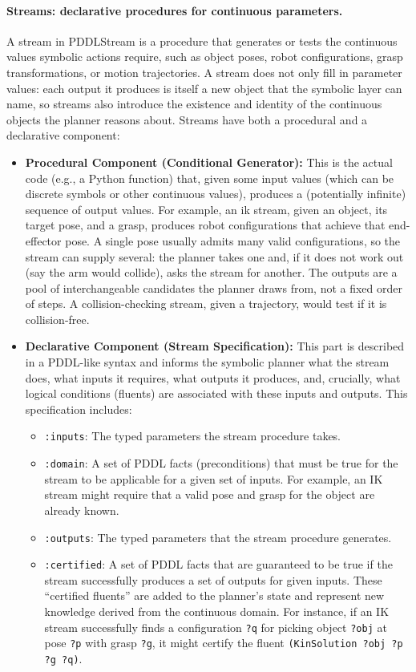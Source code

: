 \paragraph{Streams: declarative procedures for continuous parameters.}
A stream in PDDLStream is a procedure that generates or tests the continuous values symbolic actions require, such as object poses, robot configurations, grasp transformations, or motion trajectories. A stream does not only fill in parameter values: each output it produces is itself a new object that the symbolic layer can name, so streams also introduce the existence and identity of the continuous objects the planner reasons about. Streams have both a procedural and a declarative component:
\begin{itemize}
    \item \textbf{Procedural Component (Conditional Generator):} This is the actual code (e.g., a Python function) that, given some input values (which can be discrete symbols or other continuous values), produces a (potentially infinite) sequence of output values. For example, an \ac{ik} stream, given an object, its target pose, and a grasp, produces robot configurations that achieve that end-effector pose. A single pose usually admits many valid configurations, so the stream can supply several: the planner takes one and, if it does not work out (say the arm would collide), asks the stream for another. The outputs are a pool of interchangeable candidates the planner draws from, not a fixed order of steps. A collision-checking stream, given a trajectory, would test if it is collision-free.
    \item \textbf{Declarative Component (Stream Specification):} This part is described in a PDDL-like syntax and informs  the symbolic planner what the stream does, what inputs it requires, what outputs it produces, and, crucially, what logical conditions (fluents) are associated with these inputs and outputs. This specification includes:
        \begin{itemize}
            \item \texttt{:inputs}: The typed parameters the stream procedure takes.
            \item \texttt{:domain}: A set of PDDL facts (preconditions) that must be true for the stream to be applicable for a given set of inputs. For example, an IK stream might require that a valid pose and grasp for the object are already known.
            \item \texttt{:outputs}: The typed parameters that the stream procedure generates.
            \item \texttt{:certified}: A set of PDDL facts that are guaranteed to be true if the stream successfully produces a set of outputs for given inputs. These ``certified fluents'' are added to the planner's state and represent new knowledge derived from the continuous domain. For instance, if an IK stream successfully finds a configuration \texttt{?q} for picking object \texttt{?obj} at pose \texttt{?p} with grasp \texttt{?g}, it might certify the fluent \texttt{(KinSolution ?obj ?p ?g ?q)}.
        \end{itemize}
\end{itemize}
